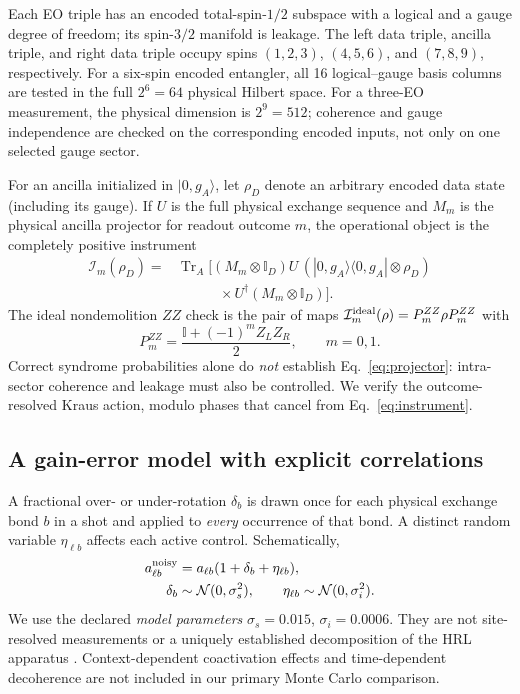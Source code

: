 \documentclass[aps,prx,twocolumn,superscriptaddress,10pt,longbibliography,floatfix]{revtex4-2}
\newcommand{\Tr}{\operatorname{Tr}}
\newcommand{\id}{\mathbb I}
\newcommand{\Ical}{\mathcal I}
\begin{document}
Each EO triple has an encoded total-spin-$1/2$ subspace with a logical and a gauge degree of freedom; its spin-$3/2$ manifold is leakage. The left data triple, ancilla triple, and right data triple occupy spins $(1,2,3)$, $(4,5,6)$, and $(7,8,9)$, respectively. For a six-spin encoded entangler, all 16 logical--gauge basis columns are tested in the full $2^6=64$ physical Hilbert space. For a three-EO measurement, the physical dimension is $2^9=512$; coherence and gauge independence are checked on the corresponding encoded inputs, not only on one selected gauge sector.

For an ancilla initialized in $|0,g_A\rangle$, let $\rho_D$ denote an arbitrary encoded data state (including its gauge). If $U$ is the full physical exchange sequence and $M_m$ is the physical ancilla projector for readout outcome $m$, the operational object is the completely positive instrument
\begin{align}
\Ical_m(\rho_D)={}&\Tr_A\big[(M_m\otimes\id_D)U\, (|0,g_A\rangle\!\langle0,g_A|\otimes\rho_D)\nonumber\\
&\qquad\quad \times U^\dagger(M_m\otimes\id_D)\big].
\label{eq:instrument}
\end{align}
The ideal nondemolition $ZZ$ check is the pair of maps $\Ical_m^{\rm ideal}(\rho)=P_m^{ZZ}\rho P_m^{ZZ}$ with
\begin{equation}
 P_m^{ZZ}=\frac{\id+(-1)^m Z_LZ_R}{2},\qquad m=0,1.
 \label{eq:projector}
\end{equation}
Correct syndrome probabilities alone do \emph{not} establish Eq.~\eqref{eq:projector}: intra-sector coherence and leakage must also be controlled. We verify the outcome-resolved Kraus action, modulo phases that cancel from Eq.~\eqref{eq:instrument}.

\subsection{A gain-error model with explicit correlations}
A fractional over- or under-rotation $\delta_b$ is drawn once for each physical exchange bond $b$ in a shot and applied to \emph{every} occurrence of that bond. A distinct random variable $\eta_{\ell b}$ affects each active control. Schematically,
\begin{align}
 a_{\ell b}^{\rm noisy}&=a_{\ell b}(1+\delta_b+\eta_{\ell b}),\nonumber\\
 \delta_b&\sim\mathcal N(0,\sigma_s^2),\qquad
 \eta_{\ell b}\sim\mathcal N(0,\sigma_i^2).\label{eq:noise}
\end{align}
We use the declared \emph{model parameters} $\sigma_s=0.015$, $\sigma_i=0.0006$. They are not site-resolved measurements or a uniquely established decomposition of the HRL apparatus \cite{hrl2026}. Context-dependent coactivation effects and time-dependent decoherence are not included in our primary Monte Carlo comparison.
\end{document}
